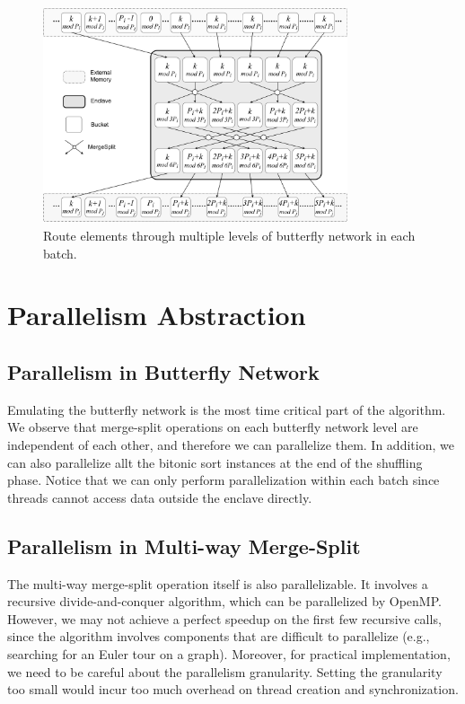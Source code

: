 \documentclass{article}
\begin{document}
\begin{figure}[thbp]
    \centering
    \includegraphics[width=0.8\textwidth]{assets/batch.png}
    \caption{Route elements through multiple levels of butterfly network in each batch.}
    \label{fig:batch}
\end{figure}

\section{Parallelism Abstraction}
\subsection{Parallelism in Butterfly Network}
Emulating the butterfly network is the most time critical part of the algorithm. We observe that merge-split operations on each butterfly network level are independent of each other, and therefore we can parallelize them. In addition, we can also parallelize allt the bitonic sort instances at the end of the shuffling phase. Notice that we can only perform parallelization within each batch since threads cannot access data outside the enclave directly.
\subsection{Parallelism in Multi-way Merge-Split}
The multi-way merge-split operation itself is also parallelizable. It involves a recursive divide-and-conquer algorithm, which can be parallelized by OpenMP. However, we may not achieve a perfect speedup on the first few recursive calls, since the algorithm involves components that are difficult to parallelize (e.g., searching for an Euler tour on a graph). Moreover, for practical implementation, we need to be careful about the parallelism granularity. Setting the granularity too small would incur too much overhead on thread creation and synchronization.
\end{document}
